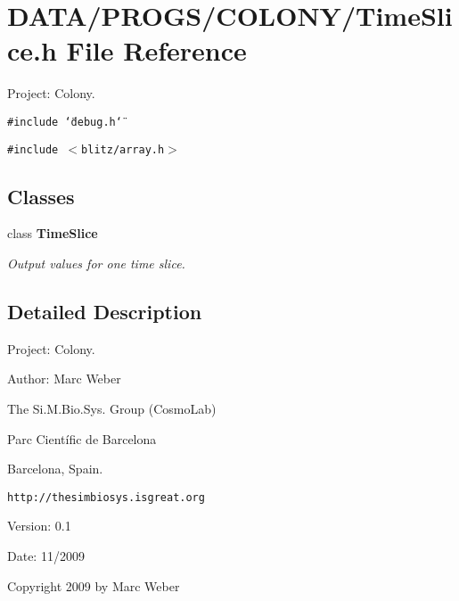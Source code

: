 \section{DATA/PROGS/COLONY/TimeSlice.h File Reference}
\label{TimeSlice_8h}
Project: Colony. 

{\tt \#include \char`\"{}debug.h\char`\"{}}\par
{\tt \#include $<$blitz/array.h$>$}\par
\subsection*{Classes}
\begin{CompactItemize}
\item 
class {\bf TimeSlice}
\begin{CompactList}\small\item\em Output values for one time slice. \item\end{CompactList}\end{CompactItemize}


\subsection{Detailed Description}
Project: Colony. 

\begin{Desc}
\item[Author:]Marc Weber\par
 The Si.M.Bio.Sys. Group (CosmoLab)\par
 Parc Científic de Barcelona\par
 Barcelona, Spain.\par
 {\tt http://thesimbiosys.isgreat.org} \end{Desc}
\begin{Desc}
\item[Version:]0.1 \end{Desc}
\begin{Desc}
\item[Date:]11/2009\end{Desc}
Copyright 2009 by Marc Weber 